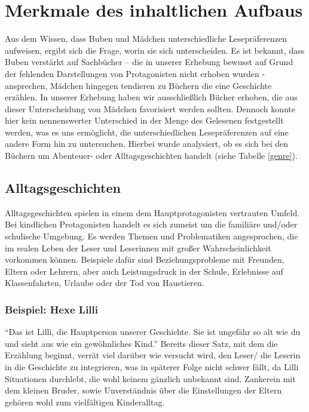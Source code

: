 \section{Merkmale des inhaltlichen Aufbaus}

Aus dem Wissen, dass Buben und Mädchen unterschiedliche Lesepräferenzen
aufweisen, ergibt sich die Frage, worin sie sich unterscheiden. Es ist
bekannt, dass Buben verstärkt auf Sachbücher -- die in unserer Erhebung
bewusst auf Grund der fehlenden Darstellungen von Protagonisten nicht
erhoben wurden - ansprechen, Mädchen hingegen tendieren zu Büchern die
eine Geschichte erzählen. In unserer Erhebung haben wir ausschließlich
Bücher erhoben, die aus dieser Unterscheidung von Mädchen favorisiert
werden sollten. Dennoch konnte hier kein nennenswerter Unterschied in
der Menge des Gelesenen festgestellt werden, was es uns ermöglicht, die
unterschiedlichen Lesepräferenzen auf eine andere Form hin zu
untersuchen. Hierbei wurde analysiert, ob es sich bei den Büchern um
Abenteuer- oder Alltagsgeschichten handelt (siehe Tabelle \ref{genre}).



\subsection{Alltagsgeschichten}

Alltagsgeschichten spielen in einem dem Hauptprotagonisten vertrauten
Umfeld. Bei kindlichen Protagonisten handelt es sich zumeist um die
familiäre und/oder schulische Umgebung. Es werden Themen und
Problematiken angesprochen, die im realen Leben der Leser und Leserinnen
mit großer Wahrscheinlichkeit vorkommen können. Beispiele dafür sind
Beziehungsprobleme mit Freunden, Eltern oder Lehrern, aber auch
Leistungsdruck in der Schule, Erlebnisse auf Klassenfahrten, Urlaube
oder der Tod von Haustieren.

\subsubsection{Beispiel: Hexe Lilli}

``Das ist Lilli, die Hauptperson unserer Geschichte. Sie ist ungefähr so
alt wie du und sieht aus wie ein gewöhnliches Kind.''
\parencite[][6]{KNISTER1999} Bereits dieser Satz, mit dem die Erzählung
beginnt, verrät viel darüber wie versucht wird, den Leser/ die Leserin
in die Geschichte zu integrieren, was in späterer Folge nicht schwer
fällt, da Lilli Situationen durchlebt, die wohl keinem gänzlich
unbekannt sind. Zankerein mit dem kleinen Bruder, sowie Unverständnis
über die Einstellungen der Eltern gehören wohl zum vielfältigen
Kinderalltag.

